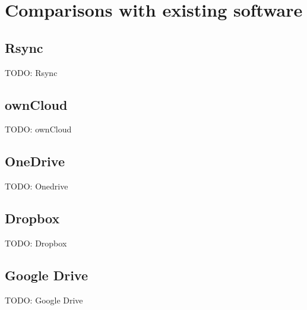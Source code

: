 
\chapter{Comparisons with existing software}



\section{Rsync}
  TODO: Rsync
\section{ownCloud}
  TODO: ownCloud
\section{OneDrive}
  TODO: Onedrive
\section{Dropbox}
  TODO: Dropbox
\section{Google Drive}
  TODO: Google Drive
